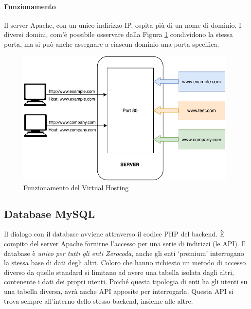 \paragraph{Funzionamento} Il server Apache, con un unico indirizzo IP, ospita più di un nome di dominio. I diversi domini, com'è  possibile osservare dalla Figura \ref{fig:virtualhosting} condividono la stessa porta, ma si può anche assegnare a ciascun dominio una porta specifica.

\begin{figure}[H]
    \centering
    \includegraphics[width=0.98\textwidth]{images/02_4_virtual_hosting.pdf}
    \caption{Funzionamento del Virtual Hosting}
    \label{fig:virtualhosting}
\end{figure}

\subsection{Database MySQL}
Il dialogo con il database avviene attraverso il codice PHP del backend. È compito del server Apache fornirne l'accesso per una serie di indirizzi (le API). Il database è \textit{unico per tutti gli enti Zerocoda}, anche gli enti `premium' interrogano la stessa base di dati degli altri. Coloro che hanno richiesto un metodo di accesso diverso da quello standard si limitano ad avere una tabella isolata dagli altri, contenente i dati dei propri utenti. Poiché questa tipologia di enti ha gli utenti su una tabella diversa, avrà anche API apposite per interrogarla. Questa API si trova sempre all'interno dello stesso backend, insieme alle altre.

